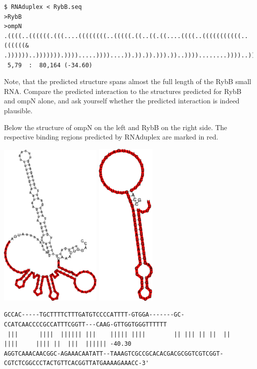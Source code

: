 \documentclass[]{article}
\begin{document}
\begin{verbatim}
$ RNAduplex < RybB.seq
>RybB
>ompN
.((((..((((((.(((....((((((((..(((((.((..((.((....((((..(((((((((((..((((((&
.))))))..))))))).)))).....))))....)).)).)).))).))..))))........))))..))).)))))).)))).
 5,79  :  80,164 (-34.60)
\end{verbatim}

Note, that the predicted structure spans almost the full length of the
RybB small RNA. Compare the predicted interaction to the structures
predicted for RybB and ompN alone, and ask yourself whether the
predicted interaction is indeed plausible.

Below the structure of ompN on the left and RybB on the right side. The
respective binding regions predicted by RNAduplex are marked in red.

\includegraphics{Figs/ompN_ss.png}
\includegraphics{Figs/RybB_ss.png}

\begin{verbatim}
GCCAC-----TGCTTTTCTTTGATGTCCCCATTTT-GTGGA-------GC-CCATCAACCCCGCCATTTCGGTT---CAAG-GTTGGTGGGTTTTTT
 |||      ||||  |||||| |||    ||||| ||||        || ||| || ||  ||    ||||     |||| ||  |||  |||||| -40.30
AGGTCAAACAACGGC-AGAAACAATATT--TAAAGTCGCCGCACACGACGCGGTCGTCGGT-CGTCTCGGCCCTACTGTTCACGGTTATGAAAAGAAACC-3'
\end{verbatim}
\end{document}
